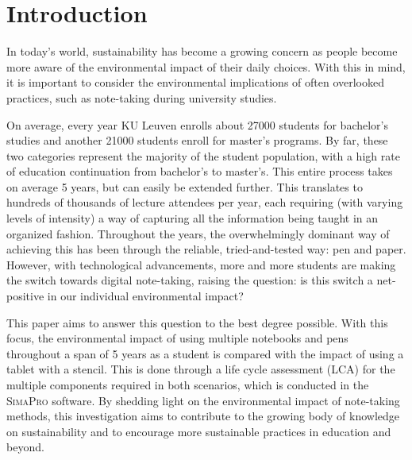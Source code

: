 \section{Introduction}\label{sec:introduction}

In today's world, sustainability has become a growing concern as people become more aware of the environmental impact of their daily choices. With this in mind, it is important to consider the environmental implications of often overlooked practices, such as note-taking during university studies.

On average, every year KU Leuven enrolls about 27000 students for bachelor's studies and another 21000 students enroll for master's programs. By far, these two categories represent the majority of the student population, with a high rate of education continuation from bachelor's to master's. This entire process takes on average 5 years, but can easily be extended further. This translates to hundreds of thousands of lecture attendees per year, each requiring (with varying levels of intensity) a way of capturing all the information being taught in an organized fashion. Throughout the years, the overwhelmingly dominant way of achieving this has been through the reliable, tried-and-tested way: pen and paper. However, with technological advancements, more and more students are making the switch towards digital note-taking, raising the question: is this switch a net-positive in our individual environmental impact?

This paper aims to answer this question to the best degree possible. With this focus, the environmental impact of using multiple notebooks and pens throughout a span of 5 years as a student is compared with the impact of using a tablet with a stencil. This is done through a life cycle assessment (LCA) for the multiple components required in both scenarios, which is conducted in the \textsc{SimaPro} software. By shedding light on the environmental impact of note-taking methods, this investigation aims to contribute to the growing body of knowledge on sustainability and to encourage more sustainable practices in education and beyond.
